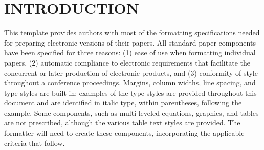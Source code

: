 \section{INTRODUCTION} 

This template provides authors with most of the formatting specifications needed 
for preparing electronic versions of their papers. All standard paper components 
have been specified for three reasons: (1) ease of use when formatting 
individual papers, (2) automatic compliance to electronic requirements that 
facilitate the concurrent or later production of electronic products, and (3) 
conformity of style throughout a conference proceedings. Margins, column widths, 
line spacing, and type styles are built-in; examples of the type styles are 
provided throughout this document and are identified in italic type, within 
parentheses, following the example. Some components, such as multi-leveled 
equations, graphics, and tables are not prescribed, although the various table 
text styles are provided. The formatter will need to create these components, 
incorporating the applicable criteria that follow.

